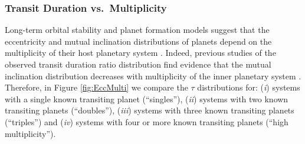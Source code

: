 \documentclass{aastex62}
\begin{document}
\subsubsection{Transit Duration vs.~Multiplicity}\label{sec:eccmultiplicity}
%
Long-term orbital stability and planet formation models suggest that the eccentricity and mutual inclination distributions of planets depend on the multiplicity of their host planetary system \citep{Pu:2015,Gratia:2021,Bartram:2021}.
Indeed, previous studies of the observed transit duration ratio distribution find evidence that the mutual inclination distribution decreases with multiplicity of the inner planetary system \citep{He:2020,Yang:2020}. 
Therefore, in Figure \ref{fig:EccMulti} we compare the $\tau$ distributions for: ({\it i}) systems with a single known transiting planet (``singles''), 
({\it ii}) systems with two known transiting planets (``doubles''),  ({\it iii}) systems with three known transiting planets (``triples'') and ({\it iv}) systems with four or more known transiting planets (``high multiplicity'').  

\end{document}
